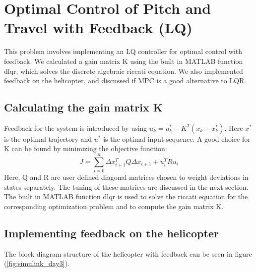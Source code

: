 \section{Optimal Control of Pitch and Travel with Feedback (LQ)}\label{sec:prob3}
This problem involves implementing an LQ controller for optimal control with feedback. We calculated a gain matrix K using the built in MATLAB function dlqr, which solves the  discrete algebraic riccati equation. We also implemented feedback on the helicopter, and discussed if MPC is a good alternative to LQR.

\subsection{Calculating the gain matrix K}
Feedback for the system is introduced by using $u_k=u_k^*-K^T(x_k-x_k^*)$. Here $x^*$ is the optimal trajectory and $u^*$ is the optimal input sequence. A good choice for K can be found by minimizing the objective function:
\begin{equation}
J = \sum_{i=0}^\infty {\Delta x_{i+1}^TQ\Delta x_{i+1} + u_{i}^TRu_{i}}
\end{equation}
Here, Q and R are user defined diagonal matrices chosen to weight deviations in states separately. The tuning of these matrices are discussed in the next section. The built in MATLAB function dlqr is used to solve the riccati equation for the corresponding optimization problem and to compute the gain matrix K. 

\subsection{Implementing feedback on the helicopter}
The block diagram structure of the helicopter with feedback can be seen in figure (\ref{fig:simulink_day3}).

